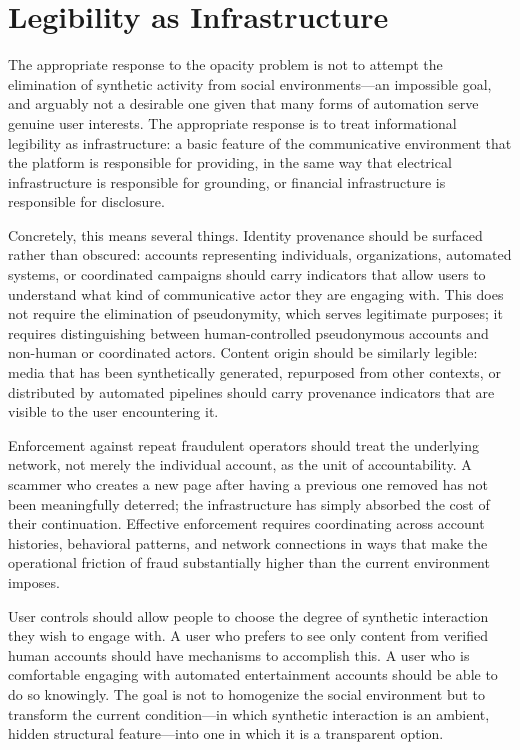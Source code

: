 \documentclass[12pt,a4paper]{article}
\begin{document}
\section{Legibility as Infrastructure}

The appropriate response to the opacity problem is not to attempt the elimination of synthetic
activity from social environments---an impossible goal, and arguably not a desirable one given
that many forms of automation serve genuine user interests. The appropriate response is to treat
informational legibility as infrastructure: a basic feature of the communicative environment
that the platform is responsible for providing, in the same way that electrical infrastructure
is responsible for grounding, or financial infrastructure is responsible for disclosure.

Concretely, this means several things. Identity provenance should be surfaced rather than
obscured: accounts representing individuals, organizations, automated systems, or coordinated
campaigns should carry indicators that allow users to understand what kind of communicative
actor they are engaging with. This does not require the elimination of pseudonymity, which serves
legitimate purposes; it requires distinguishing between human-controlled pseudonymous accounts and
non-human or coordinated actors. Content origin should be similarly legible: media that has been
synthetically generated, repurposed from other contexts, or distributed by automated pipelines
should carry provenance indicators that are visible to the user encountering it.

Enforcement against repeat fraudulent operators should treat the underlying network, not merely
the individual account, as the unit of accountability. A scammer who creates a new page after
having a previous one removed has not been meaningfully deterred; the infrastructure has simply
absorbed the cost of their continuation. Effective enforcement requires coordinating across
account histories, behavioral patterns, and network connections in ways that make the operational
friction of fraud substantially higher than the current environment imposes.

User controls should allow people to choose the degree of synthetic interaction they wish to
engage with. A user who prefers to see only content from verified human accounts should have
mechanisms to accomplish this. A user who is comfortable engaging with automated entertainment
accounts should be able to do so knowingly. The goal is not to homogenize the social environment
but to transform the current condition---in which synthetic interaction is an ambient, hidden
structural feature---into one in which it is a transparent option.
\end{document}
